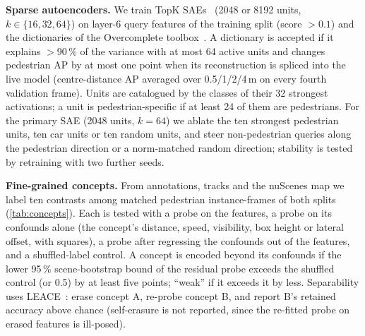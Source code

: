 \documentclass[journal]{IEEEtran}
\begin{document}
\textbf{Sparse autoencoders.} We train TopK SAEs~\cite{gao2025sae} (2048 or 8192 units, $k\in\{16,32,64\}$) on
\SAEntrain{} layer-6 query features of the training split (score $>0.1$) and the dictionaries of the Overcomplete
toolbox~\cite{fel2025archetypal}. A dictionary is accepted if it explains $>$90\,\% of the variance with at most 64
active units and changes pedestrian AP by at most one point when its reconstruction is spliced into the live model
(centre-distance AP averaged over 0.5/1/2/4\,m on every fourth validation frame). Units are catalogued by the classes
of their 32 strongest activations; a unit is pedestrian-specific if at least 24 of them are pedestrians. For the
primary SAE (2048 units, $k{=}64$) we ablate the ten strongest pedestrian units, ten car units or ten random units, and
steer non-pedestrian queries along the pedestrian direction or a norm-matched random direction; stability is tested by
retraining with two further seeds.

\textbf{Fine-grained concepts.} From annotations, tracks and the nuScenes map we label ten contrasts among matched
pedestrian instance-frames of both splits (\cref{tab:concepts}). Each is tested with a probe on the features, a probe
on its confounds alone (the concept's distance, speed, visibility, box height or lateral offset, with squares), a probe
after regressing the confounds out of the features, and a shuffled-label control. A concept is encoded beyond its
confounds if the lower 95\,\% scene-bootstrap bound of the residual probe exceeds the shuffled control (or 0.5) by at
least five points; ``weak'' if it exceeds it by less. Separability uses LEACE~\cite{belrose2023leace}: erase concept A,
re-probe concept B, and report B's retained accuracy above chance (self-erasure is not reported, since the re-fitted
probe on erased features is ill-posed).
\end{document}
